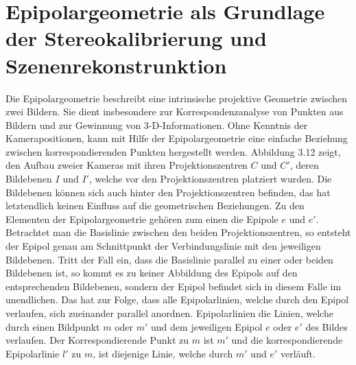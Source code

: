  
\section{Epipolargeometrie als Grundlage der Stereokalibrierung und Szenenrekonstrunktion}


Die Epipolargeometrie beschreibt eine intrinsische projektive Geometrie zwischen zwei Bildern\cite{HZ}. Sie dient insbesondere zur Korrespondenzanalyse von Punkten aus Bildern und zur Gewinnung von 3-D-Informationen. Ohne Kenntnis der Kamerapositionen, kann mit Hilfe der Epipolargeometrie eine einfache Beziehung zwischen korrespondierenden Punkten hergestellt werden. Abbildung 3.12 zeigt, den Aufbau zweier Kameras mit ihren Projektionszentren $C$ und $C'$, deren Bildebenen $I$ und $I'$, welche vor den Projektionszentren platziert wurden. Die Bildebenen können sich auch hinter den Projektionszentren befinden, das hat letztendlich keinen Einfluss auf die geometrischen Beziehungen\cite{HZ}. Zu den Elementen der Epipolargeometrie gehören zum einen die Epipole $e$ und $e'$. Betrachtet man die Basislinie zwischen den beiden Projektionszentren, so entsteht der Epipol genau am Schnittpunkt der Verbindungslinie mit den jeweiligen Bildebenen. Tritt der Fall ein, dass die Basislinie parallel zu einer oder beiden Bildebenen ist, so kommt es zu keiner Abbildung des Epipols auf den entsprechenden Bildebenen, sondern der Epipol befindet sich in diesem Falle im unendlichen\cite{ZZGXr}. Das hat zur Folge, dass alle Epipolarlinien, welche durch den Epipol verlaufen, sich zueinander parallel anordnen. Epipolarlinien die Linien, welche durch einen Bildpunkt $m$ oder $m'$ und dem jeweiligen Epipol $e$ oder $e'$ des Bildes verlaufen. Der Korrespondierende Punkt zu $m$ ist $m'$ und die korrespondierende Epipolarlinie $l'$ zu $m$, ist diejenige Linie, welche durch $m'$ und $e'$ verläuft. 


